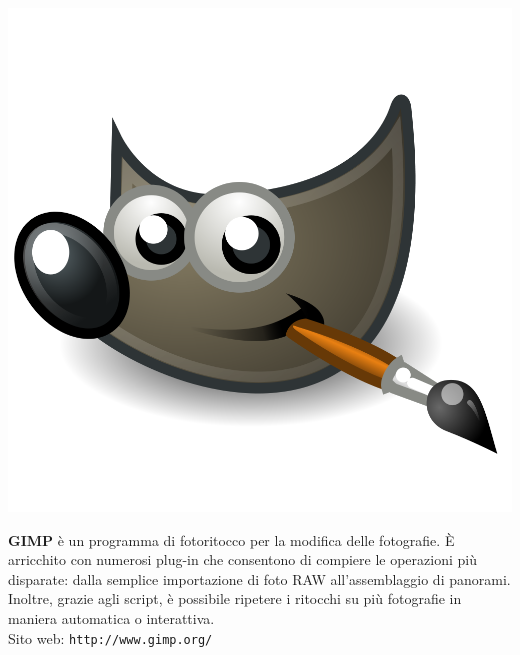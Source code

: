 \documentclass[a4paper, 12pt]{extarticle}
\begin{document}
\begin{minipage}{.2\linewidth}
    \includegraphics[width=.9\linewidth]{img/opuscolo-10.png}
\end{minipage}
\begin{minipage}{.75\linewidth}
\textbf{GIMP} è un programma di fotoritocco per la modifica delle
fotografie. È arricchito con numerosi plug-in che consentono di
compiere le operazioni più disparate: dalla semplice importazione di
foto RAW all'assemblaggio di panorami. Inoltre, grazie agli script, è
possibile ripetere i ritocchi su più fotografie in maniera automatica o
interattiva.\\
Sito web: \texttt{http://www.gimp.org/}
\end{minipage}
\end{document}
